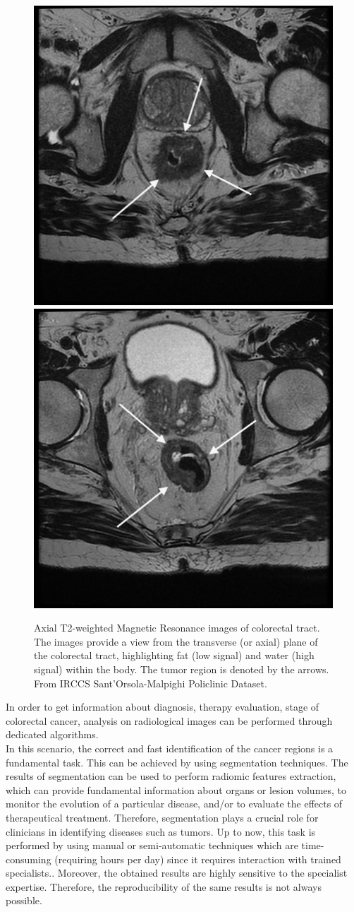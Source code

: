 \documentclass{standalone}
\begin{document}
\begin{figure}[!htp]

    \centering
    \includegraphics[width=.49\textwidth]{../images/BO11_slice_13.png}\hfill
    \includegraphics[width=.49\textwidth]{../images/BO11_slice_5.png}\hfill
    
\caption{Axial T2-weighted Magnetic Resonance images of colorectal tract. The images provide a view from the transverse (or axial) plane of the colorectal tract, highlighting fat (low signal) and water (high signal) within the body. The tumor region is denoted by the arrows.
From IRCCS Sant’Orsola-Malpighi Policlinic Dataset.}
\label{trittico}
    
\end{figure}

In order to get information about diagnosis, therapy evaluation, stage of colorectal cancer, analysis on radiological images can be performed through dedicated algorithms.
\\
In this scenario, the correct and fast identification of the cancer regions is a fundamental task.
This can be achieved by using segmentation techniques.
The results of segmentation can be used to perform radiomic features extraction, which can provide fundamental information about organs or lesion volumes, to monitor the evolution of a particular disease, and/or to evaluate the effects of therapeutical treatment.
Therefore, segmentation plays a crucial role for clinicians in identifying diseases such as tumors.
Up to now, this task is performed by using manual or semi-automatic techniques which are time-consuming (requiring hours per day) since it requires interaction with trained specialists.\cite{tesicoppola, jovana}.
Moreover, the obtained results are highly sensitive to the specialist expertise.
Therefore, the reproducibility of the same results is not always possible\cite{Trebeschi2017}.
\end{document}
